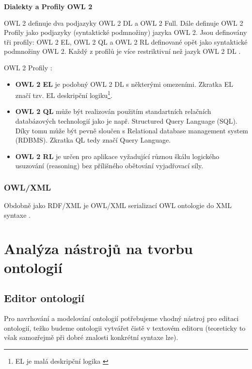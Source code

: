         \vspace*{6pt}
        \textbf{Dialekty a Profily OWL 2}
        \vspace*{6pt}
       
        OWL 2 definuje dva podjazyky OWL 2 DL a OWL 2 Full.
        Dále definuje OWL 2 Profily jako podjazyky (syntaktické podmnožiny) jazyka OWL 2. Jsou definovány tři profily: OWL 2 EL, OWL 2 QL a OWL 2 RL definované opět jako syntaktické podmnožiny OWL 2. Každý z profilů je více restriktivní než jazyk OWL 2 DL \cite{owl2primer}. 
        
        OWL 2 Profily \cite{owl2primer}:
        
        \begin{itemize}
        \item \textbf{OWL 2 EL} je podobný OWL 2 DL s některými omezeními. Zkratka EL značí tzv. EL deskripční logiku\footnote{EL je malá deskripční logika \cite{EL}}.
        
        \item \textbf{OWL 2 QL} může být realizován použitím standartních relačních databázových technologií jako je např. Structured Query Language (SQL). Díky tomu může být pevně sloučen s Relational database management system (RDBMS). Zkratka QL tedy značí Query Language.
        
        \item \textbf{OWL 2 RL} je určen pro aplikace vyžadující různou škálu logického usuzování (reasoning) bez přílišného obětování vyjadřovací síly.
        \end{itemize}
        
        \subsubsection{OWL/XML}
        
        Obdobně jako RDF/XML je OWL/XML serializací OWL ontologie do XML syntaxe \cite{owlxml}.
        
\section{Analýza nástrojů na tvorbu ontologií}

\subsection{Editor ontologií}
Pro navrhování a modelování ontologií potřebujeme vhodný nástroj pro editaci ontologií, težko budeme ontologii vytvářet čistě v textovém editoru (teoreticky to však samozřejmě při dobré znalosti konkrétní syntaxe lze).

